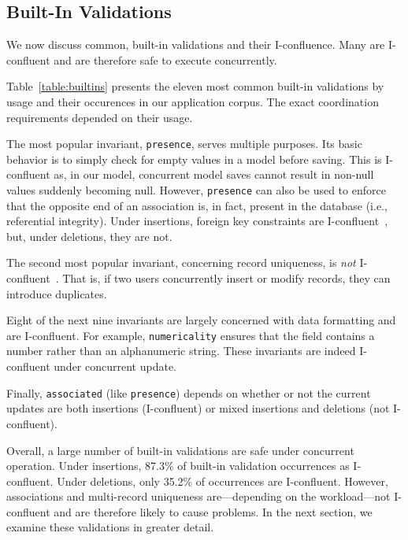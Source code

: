 \subsection{Built-In Validations}

We now discuss common, built-in validations and their
I-confluence. Many are I-confluent and are therefore safe to execute
concurrently.

Table~\ref{table:builtins} presents the eleven most common built-in
validations by usage and their occurences in our application
corpus. The exact coordination requirements depended on their usage.

The most popular invariant, \texttt{presence}, serves multiple purposes. Its
basic behavior is to simply check for empty values in a model before
saving. This is I-confluent as, in our model, concurrent model saves
cannot result in non-null values suddenly becoming null. However,
\texttt{presence} can also be used to enforce that the opposite end of
an association is, in fact, present in the database (i.e., referential
integrity). Under insertions, foreign key constraints are
I-confluent~\cite{coord-avoid}, but, under deletions, they are not.

The second most popular invariant, concerning record uniqueness, is
\textit{not} I-confluent~\cite{coord-avoid}. That is, if two users
concurrently insert or modify records, they can introduce duplicates.

Eight of the next nine invariants are largely concerned with data
formatting and are I-confluent. For example, \texttt{numericality}
ensures that the field contains a number rather than an alphanumeric
string. These invariants are indeed I-confluent under concurrent
update.

Finally, \texttt{associated} (like \texttt{presence}) depends on
whether or not the current updates are both insertions (I-confluent)
or mixed insertions and deletions (not I-confluent).

Overall, a large number of built-in validations are safe under
concurrent operation. Under insertions, 87.3\% of built-in validation
occurrences as I-confluent. Under deletions, only 35.2\% of
occurrences are I-confluent.  However, associations and multi-record
uniqueness are---depending on the workload---not I-confluent and are
therefore likely to cause problems. In the next section, we examine
these validations in greater detail.

